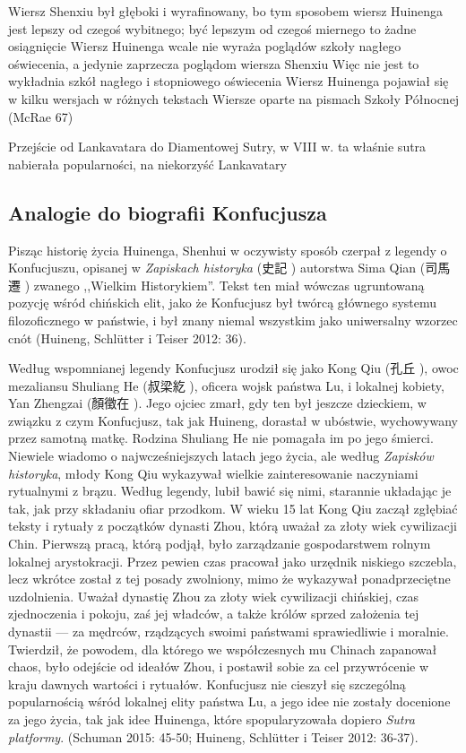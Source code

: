 Wiersz Shenxiu był głęboki i wyrafinowany, bo tym sposobem wiersz Huinenga jest lepszy od czegoś wybitnego; być lepszym od czegoś miernego to żadne osiągnięcie
Wiersz Huinenga wcale nie wyraża poglądów szkoły nagłego oświecenia, a jedynie zaprzecza poglądom wiersza Shenxiu
Więc nie jest to wykładnia szkół nagłego i stopniowego oświecenia
Wiersz Huinenga pojawiał się w kilku wersjach w różnych tekstach
Wiersze oparte na pismach Szkoły Północnej (McRae 67)

Przejście od Lankavatara do Diamentowej Sutry, w VIII w. ta właśnie sutra nabierała popularności, na niekorzyść Lankavatary
\fi
\subsection{Analogie do biografii Konfucjusza}
Pisząc historię życia Huinenga, Shenhui w oczywisty sposób czerpał z legendy o Konfucjuszu, opisanej w \textit{Zapiskach historyka} (史記 ) autorstwa Sima Qian (司馬遷 ) zwanego ,,Wielkim Historykiem''. Tekst ten miał wówczas ugruntowaną pozycję wśród chińskich elit, jako że Konfucjusz był twórcą głównego systemu filozoficznego w państwie, i był znany niemal wszystkim jako uniwersalny wzorzec cnót (Huineng, Schlütter i Teiser 2012: 36).

Według wspomnianej legendy Konfucjusz urodził się jako Kong Qiu (孔丘 ), owoc mezaliansu Shuliang He (叔梁紇 ), oficera wojsk państwa Lu, i lokalnej kobiety, Yan Zhengzai (顏徵在 ). Jego ojciec zmarł, gdy ten był jeszcze dzieckiem, w związku z czym Konfucjusz, tak jak Huineng, dorastał w ubóstwie, wychowywany przez samotną matkę. Rodzina Shuliang He nie pomagała im po jego śmierci. Niewiele wiadomo o najwcześniejszych latach jego życia, ale według \textit{Zapisków historyka}, młody Kong Qiu wykazywał wielkie zainteresowanie naczyniami rytualnymi z brązu. Według legendy, lubił bawić się nimi, starannie układając je tak, jak przy składaniu ofiar przodkom. W wieku 15 lat Kong Qiu zaczął zgłębiać teksty i rytuały z początków dynasti Zhou\fnm, którą uważał za złoty wiek cywilizacji Chin. Pierwszą pracą, którą podjął, było zarządzanie gospodarstwem rolnym lokalnej arystokracji. Przez pewien czas pracował jako urzędnik niskiego szczebla, lecz wkrótce został z tej posady zwolniony, mimo że wykazywał ponadprzeciętne uzdolnienia. Uważał dynastię Zhou za złoty wiek cywilizacji chińskiej, czas zjednoczenia i pokoju, zaś jej władców, a także królów sprzed założenia tej dynastii --- za mędrców, rządzących swoimi państwami sprawiedliwie i moralnie. Twierdził, że powodem, dla którego we współczesnych mu Chinach zapanował chaos, było odejście od ideałów Zhou, i postawił sobie za cel przywrócenie w kraju dawnych wartości i rytuałów. Konfucjusz nie cieszył się szczególną popularnością wśród lokalnej elity państwa Lu, a jego idee nie zostały docenione za jego życia, tak jak idee Huinenga, które spopularyzowała dopiero \textit{Sutra platformy}. (Schuman 2015: 45-50; Huineng, Schlütter i Teiser 2012: 36-37).%

